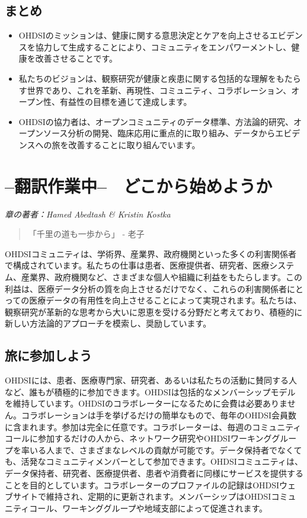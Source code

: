 \documentclass[
  11pt]{book}
\makeatletter
\newenvironment{kframe}{%
\medskip{}
\setlength{\fboxsep}{.8em}
 \def\at@end@of@kframe{}%
 \ifinner\ifhmode%
  \def\at@end@of@kframe{\end{minipage}}%
  \begin{minipage}{\columnwidth}%
 \fi\fi%
 \def\FrameCommand##1{\hskip\@totalleftmargin \hskip-\fboxsep
 \colorbox{myShadeColor}{##1}\hskip-\fboxsep
     \hskip-\linewidth \hskip-\@totalleftmargin \hskip\columnwidth}%
 \MakeFramed {\advance\hsize-\width
   \@totalleftmargin\z@ \linewidth\hsize
   \@setminipage}}%
 {\par\unskip\endMakeFramed%
 \at@end@of@kframe}
\newenvironment{rmdblock}[1]
  {
  \begin{itemize}
  \renewcommand{\labelitemi}{
    \raisebox{-.7\height}[0pt][0pt]{
      {\setkeys{Gin}{width=3em,keepaspectratio}\texttt{[image: images/\#1]}}
    }
  }
  \setlength{\fboxsep}{1em}
  \begin{kframe}
  \item
  }
  {
  \end{kframe}
  \end{itemize}
  }
\newenvironment{rmdsummary}
  {\begin{rmdblock}{summary}}
  {\end{rmdblock}}
\theoremstyle{definition}
\theoremstyle{definition}
\theoremstyle{definition}
\theoremstyle{definition}
\theoremstyle{remark}
\makeatother
\begin{document}
\section{まとめ}\label{ux307eux3068ux3081}

\begin{rmdsummary}
\begin{itemize}
\item
  OHDSIのミッションは、健康に関する意思決定とケアを向上させるエビデンスを協力して生成することにより、コミュニティをエンパワーメントし、健康を改善させることです。
\item
  私たちのビジョンは、観察研究が健康と疾患に関する包括的な理解をもたらす世界であり、これを革新、再現性、コミュニティ、コラボレーション、オープン性、有益性の目標を通じて達成します。
\item
  OHDSIの協力者は、オープンコミュニティのデータ標準、方法論的研究、オープンソース分析の開発、臨床応用に重点的に取り組み、データからエビデンスへの旅を改善することに取り組んでいます。
\end{itemize}
\end{rmdsummary}

\chapter{--翻訳作業中--　どこから始めようか}\label{WhereToBegin}

\emph{章の著者：Hamed Abedtash \& Kristin Kostka}

\begin{quote}
「千里の道も一歩から」 - 老子
\end{quote}

OHDSIコミュニティは、学術界、産業界、政府機関といった多くの利害関係者で構成されています。私たちの仕事は患者、医療提供者、研究者、医療システム、産業界、政府機関など、さまざまな個人や組織に利益をもたらします。この利益は、医療データ分析の質を向上させるだけでなく、これらの利害関係者にとっての医療データの有用性を向上させることによって実現されます。私たちは、観察研究が革新的な思考から大いに恩恵を受ける分野だと考えており、積極的に新しい方法論的アプローチを模索し、奨励しています。

\section{旅に参加しよう}\label{ux65c5ux306bux53c2ux52a0ux3057ux3088ux3046}

OHDSIには、患者、医療専門家、研究者、あるいは私たちの活動に賛同する人など、誰もが積極的に参加できます。OHDSIは包括的なメンバーシップモデルを維持しています。OHDSIのコラボレーターになるために会費は必要ありません。コラボレーションは手を挙げるだけの簡単なもので、毎年のOHDSI会員数に含まれます。参加は完全に任意です。コラボレーターは、毎週のコミュニティコールに参加するだけの人から、ネットワーク研究やOHDSIワーキンググループを率いる人まで、さまざまなレベルの貢献が可能です。データ保持者でなくても、活発なコミュニティメンバーとして参加できます。OHDSIコミュニティは、データ保持者、研究者、医療提供者、患者や消費者に同様にサービスを提供することを目的としています。コラボレーターのプロファイルの記録はOHDSIウェブサイトで維持され、定期的に更新されます。メンバーシップはOHDSIコミュニティコール、ワーキンググループや地域支部によって促進されます。
\end{document}
